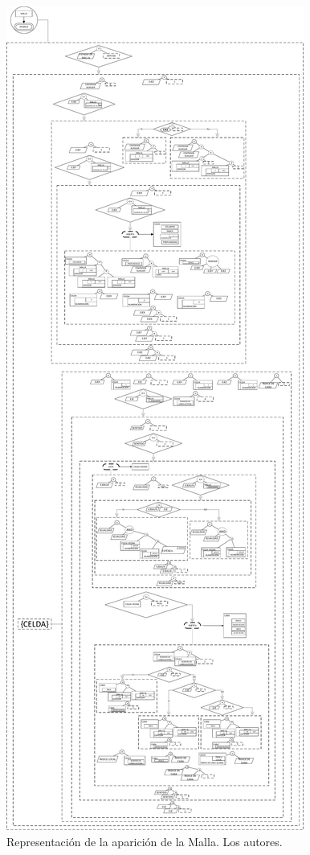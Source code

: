 \begin{figure}[h]
	\centering%
	\includegraphics[height=0.9\textheight]{Fig/MallaAparece.pdf}%
	\caption[Representación de la aparición de la Malla.]{Representación de la aparición de la Malla. Los autores.} \label{fig:MeshAppears}
\end{figure}

